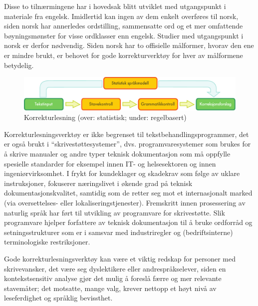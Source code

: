 \begin{multicols}{2}
Disse to tilnærmingene har i hovedsak blitt utviklet med utgangspunkt i materiale fra engelsk. Imidlertid kan ingen av dem enkelt overføres til norsk, siden norsk har annerledes ordstilling, sammensatte ord og et mer omfattende bøyningsmønster for visse ordklasser enn engelsk. Studier med utgangspunkt i norsk er derfor nødvendig. Siden norsk har to offisielle målformer, hvorav den ene er mindre brukt, er behovet for gode korrekturverktøy for hver av målformene betydelig.

\begin{figure}[htb]
  \center
  \includegraphics[width=\textwidth]{../_media/norwegian-bokmaal/language_checking}
  \caption{Korrekturlesning (over: statistisk; under: regelbasert)}
  \label{fig:langcheckingaarch_no}
\end{figure}

Korrekturlesningsverktøy er ikke begrenset til tekstbehandlingsprogrammer, det er også brukt i  “skrivestøttesystemer”, dvs. programvaresystemer som brukes for å skrive manualer og andre typer teknisk dokumentasjon som må oppfylle spesielle standarder for eksempel innen IT- og helsesektoren og innen ingeniørvirksomhet. I frykt for kundeklager og skadekrav som følge av uklare instruksjoner, fokuserer næringslivet i økende grad på teknisk dokumentasjonskvalitet, samtidig som de retter seg mot et internasjonalt marked (via oversettelses- eller lokaliseringstjenester). Fremskritt innen prosessering av naturlig språk har ført til utvikling av programvare for skrivestøtte. Slik programvare hjelper forfattere av teknisk dokumentasjon til å bruke ordforråd og setningsstrukturer som er i samsvar med industriregler og (bedriftsinterne) terminologiske restriksjoner.


Gode korrekturlesningsverktøy kan være et viktig redskap for personer med skrivevansker, det være seg dyslektikere eller andrespråkselever, siden en kontekstsensitiv analyse gjør det mulig å foreslå færre og mer relevante stavemåter; det motsatte, mange valg, krever nettopp et høyt nivå av leseferdighet og språklig bevissthet.


\end{multicols}
